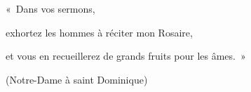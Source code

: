 «~Dans vos sermons,\par
exhortez les hommes à réciter mon Rosaire,\par
et vous en recueillerez de grands fruits pour les âmes.~»\par
(Notre-Dame à saint Dominique)